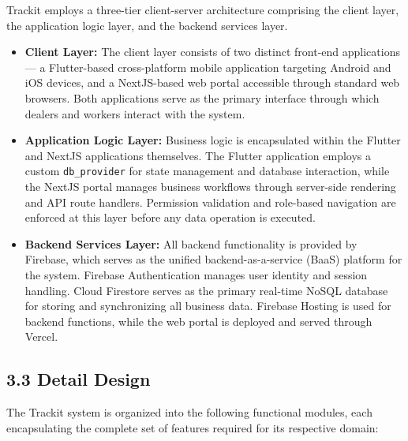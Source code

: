 \documentclass[12pt, oneside]{article}
\begin{document}
Trackit employs a three-tier client-server architecture comprising the client layer, the application logic layer, and the backend services layer.

\begin{itemize}
    \item \textbf{Client Layer:} The client layer consists of two distinct front-end applications — a Flutter-based cross-platform mobile application targeting Android and iOS devices, and a NextJS-based web portal accessible through standard web browsers. Both applications serve as the primary interface through which dealers and workers interact with the system.

    \item \textbf{Application Logic Layer:} Business logic is encapsulated within the Flutter and NextJS applications themselves. The Flutter application employs a custom \texttt{db\_provider} for state management and database interaction, while the NextJS portal manages business workflows through server-side rendering and API route handlers. Permission validation and role-based navigation are enforced at this layer before any data operation is executed.

    \item \textbf{Backend Services Layer:} All backend functionality is provided by Firebase, which serves as the unified backend-as-a-service (BaaS) platform for the system. Firebase Authentication manages user identity and session handling. Cloud Firestore serves as the primary real-time NoSQL database for storing and synchronizing all business data. Firebase Hosting is used for backend functions, while the web portal is deployed and served through Vercel.
\end{itemize}

\subsection*{3.3 Detail Design}

The Trackit system is organized into the following functional modules, each encapsulating the complete set of features required for its respective domain:
\end{document}
